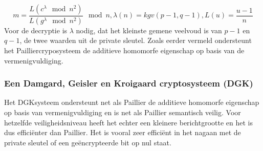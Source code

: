 \begin{equation}\label{paillierdec} m = \frac{L(c^{\lambda}\mod n^2)}{L(g^{\lambda} \mod n^2)}\mod n, \lambda(n) =kgv (p-1,q-1), L(u)=\frac{u-1}{n}
\end{equation}
Voor de decryptie is $\lambda$ nodig, dat het kleinste gemene veelvoud is van $p-1$ en $q-1$, de twee waarden uit de private sleutel. Zoals eerder vermeld ondersteunt het Pailliercryposysteem de additieve homomorfe eigenschap op basis van de vermenigvuldiging. 
\begin{comment}
Deze eigenschap kan snel aangetoond worden. 
\end{comment}
\subsubsection{Een Damgard, Geisler en Kroigaard cryptosysteem (DGK)}
\label{dgk}
Het DGKsysteem ondersteunt net als Paillier de additieve homomorfe eigenschap op basis van vermenigvuldiging en is net als Paillier semantisch veilig. Voor hetzelfde veiligheidsniveau heeft het echter een kleinere berichtgrootte en het is dus effici\"enter dan Paillier. Het is vooral zeer effici\"ent in het nagaan met de private sleutel of een ge\"encrypteerde bit op nul staat.